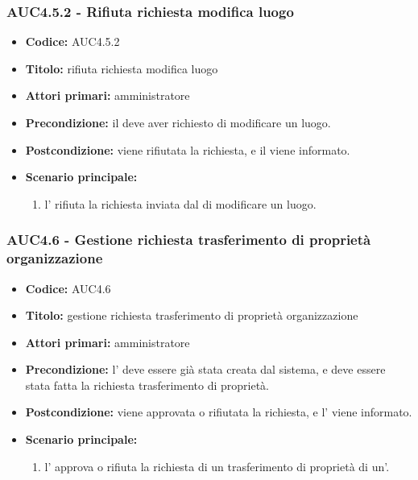 \documentclass[casi-duso]{subfiles}
\begin{document}
\subsubsection{AUC4.5.2 - Rifiuta richiesta modifica luogo}
\label{subsub:AUC4.5.2}
\begin{itemize}
  \item \textbf{Codice:} AUC4.5.2
  \item \textbf{Titolo:} rifiuta richiesta modifica luogo
  \item \textbf{Attori primari:} amministratore
  \item \textbf{Precondizione:} il  deve aver richiesto di modificare un luogo.
  \item \textbf{Postcondizione:} viene rifiutata la richiesta, e il  viene informato.
  \item \textbf{Scenario principale:}
  \begin{enumerate}
    \item l' rifiuta la richiesta inviata dal  di modificare un luogo.
  \end{enumerate}  
\end{itemize}

\subsubsection{AUC4.6 - Gestione richiesta trasferimento di proprietà organizzazione}
\label{subsub:AUC4.6}
\begin{itemize}
  \item \textbf{Codice:} AUC4.6
  \item \textbf{Titolo:} gestione richiesta trasferimento di proprietà organizzazione
  \item \textbf{Attori primari:} amministratore
  \item \textbf{Precondizione:} l' deve essere già stata creata dal sistema, e deve essere stata fatta la richiesta trasferimento di proprietà.
  \item \textbf{Postcondizione:} viene approvata o rifiutata la richiesta, e l' viene informato.
  \item \textbf{Scenario principale:}
  \begin{enumerate}
    \item l' approva o rifiuta la richiesta di un trasferimento di proprietà di un'.
  \end{enumerate}
\end{itemize}
\end{document}
